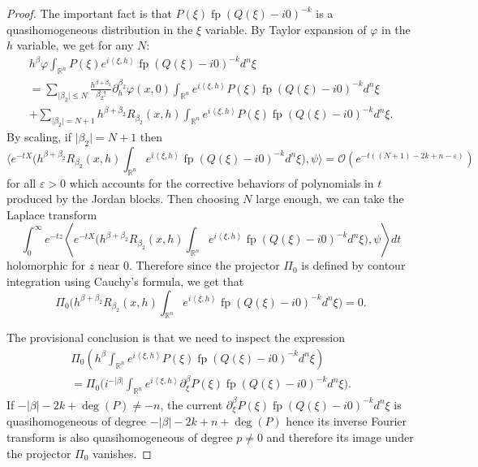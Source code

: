 \documentclass[JEP,XML,SOM,Unicode]{cedram}
\let\pazocal\mathscr
\theoremstyle{definition}
\let\euler X
\DeclareMathOperator*{\pf}{fp}
\begin{document}
\begin{proof}
The important fact is that $P(\xi)\pf(Q(\xi)-i0)^{-k}$ is a quasihomogeneous
distribution in the $\xi$ variable.
By Taylor expansion of $\varphi$ in the $h$ variable, we get for any $N$:
\begin{multline*}
h^\beta\varphi \int_{\mathbb{R}^n} P(\xi) e^{i\left\langle\xi,h\right\rangle}\pf(Q(\xi)-i0)^{-k} d^n\xi
\\ =\sum_{\vert\beta_2\vert\leqslant N} \frac{h^{\beta+\beta_2}}{\beta_2!} \partial_h^{\beta_2}\varphi(x,0) \int_{\mathbb{R}^n} e^{i\left\langle\xi,h\right\rangle}P(\xi)\pf(Q(\xi)-i0)^{-k} d^n\xi
\\ +\sum_{\vert \beta_2\vert=N+1} h^{\beta+\beta_2} R_{\beta_2}(x,h) \int_{\mathbb{R}^n} e^{i\left\langle\xi,h\right\rangle}
P(\xi)\pf(Q(\xi)-i0)^{-k} d^n\xi.
\end{multline*}
By scaling, if $\vert \beta_2\vert=N+1$ then
\[
\biggl\langle e^{-t\euler}\bigg(h^{\beta+\beta_2} R_{\beta_2}(x,h) \int_{\mathbb{R}^n} e^{i\left\langle\xi,h\right\rangle}\pf(Q(\xi)-i0)^{-k} d^n\xi\bigg), \psi \biggr\rangle=\pazocal{O}(e^{-t((N+1)-2k+n -\varepsilon)})
\]
for all $\varepsilon>0$ which accounts for the corrective behaviors of polynomials in $t$ produced by the Jordan blocks. Then choosing $N$ large enough, we can take the Laplace transform
\[
\int_0^\infty e^{-tz} \left\langle e^{-t\euler}\bigg(h^{\beta+\beta_2} R_{\beta_2}(x,h) \int_{\mathbb{R}^n} e^{i\left\langle\xi,h\right\rangle}\pf(Q(\xi)-i0)^{-k} d^n\xi\bigg), \psi \right\rangle dt
\]
holomorphic for $z$ near $0$. Therefore since the projector $\Pi_0$ is defined by contour integration using Cauchy's formula, we get
that
\[
\Pi_0\biggl(h^{\beta+\beta_2} R_{\beta_2}(x,h) \int_{\mathbb{R}^n} e^{i\left\langle\xi,h\right\rangle}\pf(Q(\xi)-i0)^{-k} d^n\xi\biggr)=0.
\]

The provisional conclusion is that we need to inspect the expression
\begin{multline*}
\Pi_0\left(h^\beta \int_{\mathbb{R}^n} e^{i\left\langle\xi,h\right\rangle}P(\xi) \pf(Q(\xi)-i0)^{-k} d^n\xi\right) \\ =
\Pi_0 \biggl(i^{-\vert\beta\vert} \int_{\mathbb{R}^n} e^{i\left\langle\xi,h\right\rangle} \partial_\xi^\beta P(\xi) \pf(Q(\xi)-i0)^{-k} d^n\xi \biggr).
\end{multline*}
If $-\vert\beta \vert-2k+\deg(P)\neq -n$, the current $ \partial_\xi^\beta P(\xi) \pf(Q(\xi)-i0)^{-k} d^n\xi$ is quasihomogeneous of degree $-\vert\beta \vert-2k+n+\deg(P) $ hence its inverse Fourier transform is also quasihomogeneous of degree $p\neq 0$ and therefore its image under the projector
$\Pi_0$ vanishes.


\end{proof}
\end{document}
